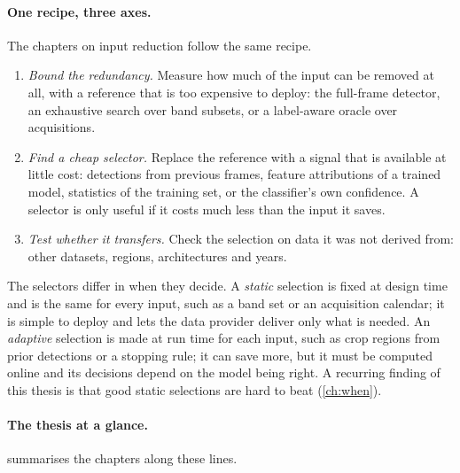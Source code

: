 \paragraph{One recipe, three axes.}
The chapters on input reduction follow the same recipe.
\begin{enumerate}
  \item \emph{Bound the redundancy.} Measure how much of the input can be removed
  at all, with a reference that is too expensive to deploy: the full-frame
  detector, an exhaustive search over band subsets, or a label-aware oracle over
  acquisitions.
  \item \emph{Find a cheap selector.} Replace the reference with a signal that is
  available at little cost: detections from previous frames, feature
  attributions of a trained model, statistics of the training set, or the
  classifier's own confidence. A selector is only useful if it costs much less
  than the input it saves.
  \item \emph{Test whether it transfers.} Check the selection on data it was not
  derived from: other datasets, regions, architectures and years.
\end{enumerate}
The selectors differ in when they decide. A \emph{static} selection is fixed at
design time and is the same for every input, such as a band set or an
acquisition calendar; it is simple to deploy and lets the data provider deliver
only what is needed. An \emph{adaptive} selection is made at run time for each
input, such as crop regions from prior detections or a stopping rule; it can
save more, but it must be computed online and its decisions depend on the
model being right. A recurring finding of this thesis is that good static
selections are hard to beat (\cref{ch:when}).

\paragraph{The thesis at a glance.}
 summarises the chapters along these lines.

